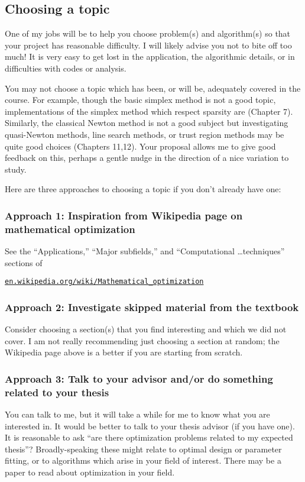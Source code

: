 \documentclass[12pt]{amsart}
\begin{document}
\subsection*{Choosing a topic}  One of my jobs will be to help you choose problem(s) and algorithm(s) so that your project has reasonable difficulty.  I will likely advise you not to bite off too much!  It is very easy to get lost in the application, the algorithmic details, or in difficulties with codes or analysis.

You may not choose a topic which has been, or will be, adequately covered in the course.  For example, though the basic simplex method is not a good topic, implementations of the simplex method which respect sparsity are (Chapter 7).  Similarly, the classical Newton method is not a good subject but investigating quasi-Newton methods, line search methods, or trust region methods may be quite good choices (Chapters 11,12).  Your proposal allows me to give good feedback on this, perhaps a gentle nudge in the direction of a nice variation to study.

Here are three approaches to choosing a topic if you don't already have one:

\subsubsection*{Approach 1: Inspiration from Wikipedia page on mathematical optimization}  See the ``Applications,'' ``Major subfields,'' and ``Computational \dots techniques'' sections of

   \centerline{\href{https://en.wikipedia.org/wiki/Mathematical_optimization}{\texttt{en.wikipedia.org/wiki/Mathematical\_optimization}}}

\subsubsection*{Approach 2: Investigate skipped material from the textbook}  Consider choosing a section(s) that you find interesting and which we did not cover.  I am not really recommending just choosing a section at random; the Wikipedia page above is a better if you are starting from scratch.

\subsubsection*{Approach 3: Talk to your advisor and/or do something related to your thesis}  You can talk to me, but it will take a while for me to know what you are interested in.  It would be better to talk to your thesis advisor (if you have one).  It is reasonable to ask ``are there optimization problems related to my expected thesis''?  Broadly-speaking these might relate to optimal design or parameter fitting, or to algorithms which arise in your field of interest.  There may be a paper to read about optimization in your field.
\end{document}
